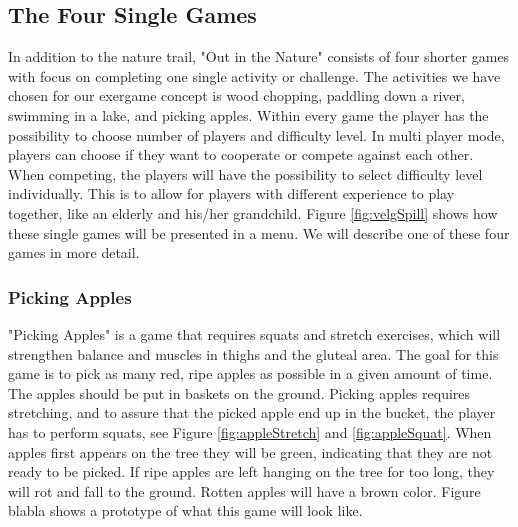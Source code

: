 \subsection{The Four Single Games}
In addition to the nature trail, "Out in the Nature" consists of four shorter games with focus on completing one single activity or challenge. The activities we have chosen for our exergame concept is wood chopping, paddling down a river, swimming in a lake, and picking apples. Within every game the player has the possibility to choose number of players and difficulty level. In multi player mode, players can choose if they want to cooperate or compete against each other. When competing, the players will have the possibility to select difficulty level individually. This is to allow for players with different experience to play together, like an elderly and his/her grandchild. Figure \ref{fig:velgSpill} shows how these single games will be presented in a menu. We will describe one of these four games in more detail.

\subsubsection{Picking Apples}
"Picking Apples" is a game that requires squats and stretch exercises, which will strengthen balance and muscles in thighs and the gluteal area. The goal for this game is to pick as many red, ripe apples as possible in a given amount of time. The apples should be put in baskets on the ground. Picking apples requires stretching, and to assure that the picked apple end up in the bucket, the player has to perform squats, see Figure \ref{fig:appleStretch} and \ref{fig:appleSquat}. When apples first appears on the tree they will be green, indicating that they are not ready to be picked. If ripe apples are left hanging on the tree for too long, they will rot and fall to the ground. Rotten apples will have a brown color. Figure blabla shows a prototype of what this game will look like.  

